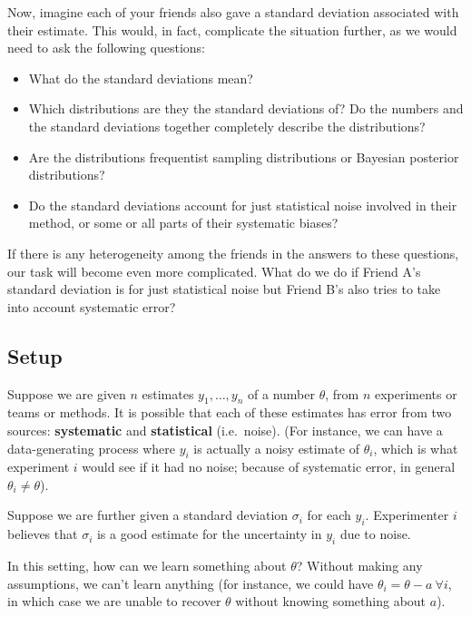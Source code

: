 \documentclass[12pt]{article}
\begin{document}
Now, imagine each of your friends also gave a standard deviation associated with their estimate. This would, in fact, complicate the situation further, as we would need to ask the following questions:

\begin{itemize}

\item
  What do the standard deviations mean?
\item
  Which distributions are they the standard deviations of? Do the numbers and the standard deviations together completely describe the distributions?
\item
  Are the distributions frequentist sampling distributions or Bayesian posterior distributions?
\item
  Do the standard deviations account for just statistical noise involved in their method, or some or all parts of their systematic biases?
\end{itemize}

If there is any heterogeneity among the friends in the answers to these questions, our task will become even more complicated. What do we do if Friend A's standard deviation is for just statistical noise but Friend B's also tries to take into account systematic error?

\subsection{Setup}\label{setup}

Suppose we are given $n$ estimates $y_1,\ldots,y_n$ of a number $\theta$, from $n$ experiments or teams or methods. It is possible that each of these estimates has error from two sources: \textbf{systematic} and \textbf{statistical} (i.e.~noise). (For instance, we can have a data-generating process where $y_i$ is actually a noisy estimate of $\theta_i$, which is what experiment $i$ would see if it had no noise; because of systematic error, in general $\theta_i\neq \theta$).

Suppose we are further given a standard deviation $\sigma_i$ for each $y_i$. Experimenter $i$ believes that $\sigma_i$ is a good estimate for the uncertainty in $y_i$ due to noise.

In this setting, how can we learn something about $\theta$? Without making any assumptions, we can't learn anything (for instance, we could have $\theta_i=\theta-a\ \forall i$, in which case we are unable to recover $\theta$ without knowing something about $a$).
\end{document}
